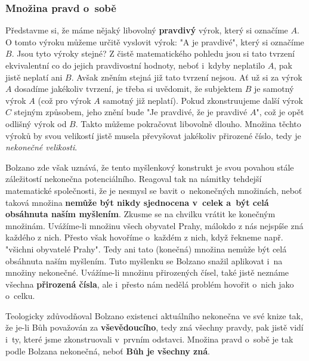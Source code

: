 \subsubsection{Množina pravd o~sobě}
Představme si, že máme nějaký libovolný \textbf{pravdivý} výrok, který si označíme $A$. O tomto výroku můžeme určitě vyslovit výrok: "A je pravdivé", který si označíme $B$. Jsou tyto výroky stejné? Z čistě matematického pohledu jsou si tato tvrzení ekvivalentní co do jejich pravdivostní hodnoty, neboť i~kdyby neplatilo $A$, pak jistě neplatí ani $B$. Avšak zněním stejná již tato tvrzení nejsou. Ať už si za výrok $A$ dosadíme jakékoliv tvrzení, je třeba si uvědomit, že subjektem $B$ je samotný výrok $A$ (což pro výrok $A$ samotný již neplatí). Pokud zkonstruujeme další výrok $C$ stejným způsobem, jeho znění bude "Je pravdivé, že je pravdivé $A$", což je opět odlišný výrok od $B$. Takto můžeme pokračovat libovolně dlouho. Množina těchto výroků by svou velikostí jistě musela převyšovat jakékoliv přirozené číslo, tedy je \emph{nekonečné velikosti}.

Bolzano zde však uznává, že tento myšlenkový konstrukt je svou povahou stále záležitostí nekonečna potenciálního. Reagoval tak na námitky tehdejší matematické společnosti, že je nesmysl se bavit o~nekonečných množinách, neboť taková množina \textbf{nemůže být nikdy sjednocena v~celek a~být celá obsáhnuta naším myšlením}. Zkusme se na chvilku vrátit ke konečným množinám. Uvážíme-li množinu všech obyvatel Prahy, málokdo z nás nejspíše zná každého z nich. Přesto však hovoříme o~každém z nich, když řekneme např. "všichni obyvatelé Prahy". Tedy ani tato (konečná) množina nemůže být celá obsáhnuta naším myšlením. Tuto myšlenku se Bolzano snažil aplikovat i~na množiny nekonečné. Uvážíme-li množinu přirozených čísel, také jistě neznáme všechna \textbf{přirozená čísla}, ale i~přesto nám nedělá problém hovořit o~nich jako o~celku.

Teologicky zdůvodňoval Bolzano existenci aktuálního nekonečna ve své knize tak, že je-li Bůh považován za \textbf{vševědoucího}, tedy zná všechny pravdy, pak jistě vidí i~ty, které jsme zkonstruovali v~prvním odstavci. Množina pravd o~sobě je tak podle Bolzana nekonečná, neboť \textbf{Bůh je všechny zná}.\cite{Bolzano1963}

